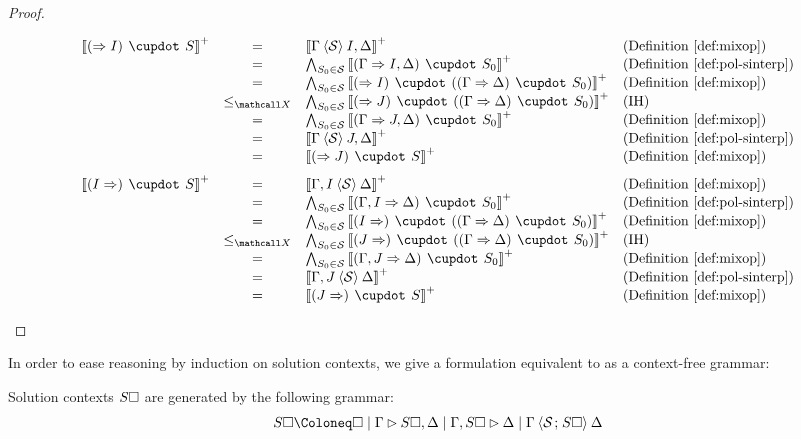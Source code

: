 \begin{proof}
\begin{itemize}
$$\begin{array}{rcll}
      \psint{(\seq I) \mix S}
      &=& \psint{\Gamma \piq{\mathcal{S}} I, \Delta} &\text{(\refdef{mixop})} \\
      &=& \bigwedge_{S_0 \in \mathcal{S}}{\psint{(\Gamma \seq I, \Delta) \mix S_0}} &\text{(\refdef{pol-sinterp})} \\
      &=& \bigwedge_{S_0 \in \mathcal{S}}{\psint{(\seq I) \mix ((\Gamma \seq \Delta) \mix S_0)}} &\text{(\refdef{mixop})} \\
      &\sementX& \bigwedge_{S_0 \in \mathcal{S}}{\psint{(\seq J) \mix ((\Gamma \seq \Delta) \mix S_0)}} &\text{(IH)} \\
      &=& \bigwedge_{S_0 \in \mathcal{S}}{\psint{(\Gamma \seq J, \Delta) \mix S_0}} &\text{(\refdef{mixop})} \\
      &=& \psint{\Gamma \piq{\mathcal{S}} J, \Delta} &\text{(\refdef{pol-sinterp})} \\
      &=& \psint{(\seq J) \mix S} &\text{(\refdef{mixop})}
    \end{array}
    $$
    $$
    \begin{array}{rcll}
      \psint{(I \seq) \mix S}
      &=& \psint{\Gamma, I \piq{\mathcal{S}} \Delta} &\text{(\refdef{mixop})} \\
      &=& \bigwedge_{S_0 \in \mathcal{S}}{\psint{(\Gamma, I \seq \Delta) \mix S_0}} &\text{(\refdef{pol-sinterp})} \\
      &=& \bigwedge_{S_0 \in \mathcal{S}}{\psint{(I \seq) \mix ((\Gamma \seq \Delta) \mix S_0)}} &\text{(\refdef{mixop})} \\
      &\sementX& \bigwedge_{S_0 \in \mathcal{S}}{\psint{(J \seq) \mix ((\Gamma \seq \Delta) \mix S_0)}} &\text{(IH)} \\
      &=& \bigwedge_{S_0 \in \mathcal{S}}{\psint{(\Gamma, J \seq \Delta) \mix S_0}} &\text{(\refdef{mixop})} \\
      &=& \psint{\Gamma, J \piq{\mathcal{S}} \Delta} &\text{(\refdef{pol-sinterp})} \\
      &=& \psint{(J \seq) \mix S} &\text{(\refdef{mixop})}
    \end{array}
    $$
  \end{itemize}
\end{proof}

In order to ease reasoning by induction on solution contexts, we give a
formulation equivalent to  as a context-free grammar:
\begin{fact}
  Solution contexts $S\square$ are generated by the following grammar:
  $$
    S\hole \Coloneq \hole \mid \Gamma \J S\hole, \Delta
                          \mid \Gamma, S\hole \J \Delta
                          \mid \Gamma \piq{\mathcal{S} \sep S\hole} \Delta
  $$
\end{fact}

